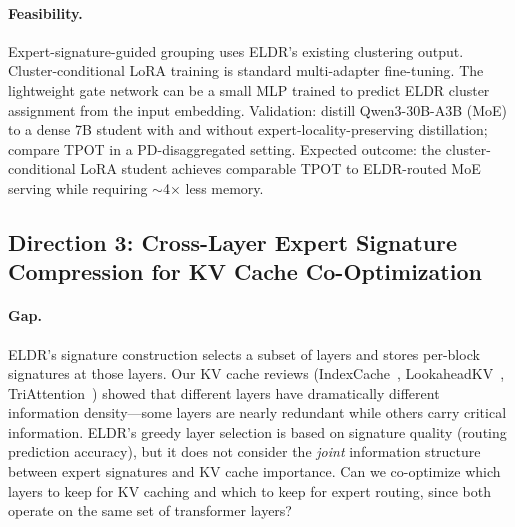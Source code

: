 \documentclass[11pt,a4paper]{article}
\begin{document}
\paragraph{Feasibility.} Expert-signature-guided grouping uses ELDR's existing clustering output. Cluster-conditional LoRA training is standard multi-adapter fine-tuning. The lightweight gate network can be a small MLP trained to predict ELDR cluster assignment from the input embedding. Validation: distill Qwen3-30B-A3B (MoE) to a dense 7B student with and without expert-locality-preserving distillation; compare TPOT in a PD-disaggregated setting. Expected outcome: the cluster-conditional LoRA student achieves comparable TPOT to ELDR-routed MoE serving while requiring $\sim$4$\times$ less memory.

\subsection{Direction 3: Cross-Layer Expert Signature Compression for KV Cache Co-Optimization}

\paragraph{Gap.} ELDR's signature construction selects a subset of layers and stores per-block signatures at those layers. Our KV cache reviews (IndexCache~\cite{indexcache2026}, LookaheadKV~\cite{lookaheadkv2026}, TriAttention~\cite{triattention2026}) showed that different layers have dramatically different information density---some layers are nearly redundant while others carry critical information. ELDR's greedy layer selection is based on signature quality (routing prediction accuracy), but it does not consider the \emph{joint} information structure between expert signatures and KV cache importance. Can we co-optimize which layers to keep for KV caching and which to keep for expert routing, since both operate on the same set of transformer layers?
\end{document}
